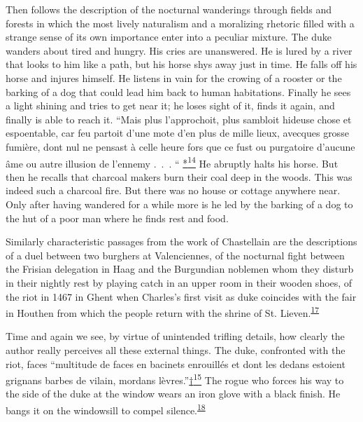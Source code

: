 Then follows the description of the nocturnal wanderings through fields
and forests in which the most lively naturalism and a moralizing
rhetoric filled with a strange sense of its own importance enter into a
peculiar mixture. The duke wanders about tired and hungry. His cries are
unanswered. He is lured by a river that
\protect\hypertarget{21_Chapter_Thirteen__IMAGE_AND_WORD.xhtmlux5cux23page_346}{}{}looks
to him like a path, but his horse shys away just in time. He falls off
his horse and injures himself. He listens in vain for the crowing of a
rooster or the barking of a dog that could lead him back to human
habitations. Finally he sees a light shining and tries to get near it;
he loses sight of it, finds it again, and finally is able to reach it.
``Mais plus l'approchoit, plus sambloit hideuse chose et espoentable,
car feu partoit d'une mote d'en plus de mille lieux, avecques grosse
fumière, dont nul ne pensast à celle heure fors que ce fust ou
purgatoire d'aucune âme ou autre illusion de l'ennemy .~.~. ``
\protect\hypertarget{21_Chapter_Thirteen__IMAGE_AND_WORD.xhtmlux5cux23id_2721}{\protect\hyperlink{23_NOTES.xhtmlux5cux23id_2722}{*\textsuperscript{14}}}
He abruptly halts his horse. But then he recalls that charcoal makers
burn their coal deep in the woods. This was indeed such a charcoal fire.
But there was no house or cottage anywhere near. Only after having
wandered for a while more is he led by the barking of a dog to the hut
of a poor man where he finds rest and food.

Similarly characteristic passages from the work of Chastellain are the
descriptions of a duel between two burghers at Valenciennes, of the
nocturnal fight between the Frisian delegation in Haag and the
Burgundian noblemen whom they disturb in their nightly rest by playing
catch in an upper room in their wooden shoes, of the riot in 1467 in
Ghent when Charles's first visit as duke coincides with the fair in
Houthen from which the people return with the shrine of St.
Lieven.\textsuperscript{\protect\hypertarget{21_Chapter_Thirteen__IMAGE_AND_WORD.xhtmlux5cux23id_276}{\protect\hyperlink{23_NOTES.xhtmlux5cux23page_436}{17}}}

Time and again we see, by virtue of unintended trifling details, how
clearly the author really perceives all these external things. The duke,
confronted with the riot, faces ``multitude de faces en bacinets
enrouillés et dont les dedans estoient grignans barbes de vilain,
mordans
lèvres.''\protect\hypertarget{21_Chapter_Thirteen__IMAGE_AND_WORD.xhtmlux5cux23id_2723}{\protect\hyperlink{23_NOTES.xhtmlux5cux23id_2724}{†\textsuperscript{15}}}
The rogue who forces his way to the side of the duke at the window wears
an iron glove with a black finish. He bangs it on the windowsill to
compel
silence.\textsuperscript{\protect\hypertarget{21_Chapter_Thirteen__IMAGE_AND_WORD.xhtmlux5cux23id_274}{\protect\hyperlink{23_NOTES.xhtmlux5cux23id_275}{18}}}

